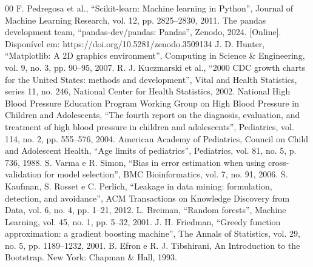 \documentclass[conference]{IEEEtran}
\begin{document}
\begin{thebibliography}{00}
 F. Pedregosa et al., ``Scikit-learn: Machine learning in Python'', Journal of Machine Learning Research, vol. 12, pp. 2825--2830, 2011.
 The pandas development team, ``pandas-dev/pandas: Pandas'', Zenodo, 2024. [Online]. Disponível em: https://doi.org/10.5281/zenodo.3509134
 J. D. Hunter, ``Matplotlib: A 2D graphics environment'', Computing in Science \& Engineering, vol. 9, no. 3, pp. 90--95, 2007.
 R. J. Kuczmarski et al., ``2000 CDC growth charts for the United States: methods and development'', Vital and Health Statistics, series 11, no. 246, National Center for Health Statistics, 2002.
 National High Blood Pressure Education Program Working Group on High Blood Pressure in Children and Adolescents, ``The fourth report on the diagnosis, evaluation, and treatment of high blood pressure in children and adolescents'', Pediatrics, vol. 114, no. 2, pp. 555--576, 2004.
 American Academy of Pediatrics, Council on Child and Adolescent Health, ``Age limits of pediatrics'', Pediatrics, vol. 81, no. 5, p. 736, 1988.
 S. Varma e R. Simon, ``Bias in error estimation when using cross-validation for model selection'', BMC Bioinformatics, vol. 7, no. 91, 2006.
 S. Kaufman, S. Rosset e C. Perlich, ``Leakage in data mining: formulation, detection, and avoidance'', ACM Transactions on Knowledge Discovery from Data, vol. 6, no. 4, pp. 1--21, 2012.
 L. Breiman, ``Random forests'', Machine Learning, vol. 45, no. 1, pp. 5--32, 2001.
 J. H. Friedman, ``Greedy function approximation: a gradient boosting machine'', The Annals of Statistics, vol. 29, no. 5, pp. 1189--1232, 2001.
 B. Efron e R. J. Tibshirani, An Introduction to the Bootstrap. New York: Chapman \& Hall, 1993.
\end{thebibliography}
\end{document}
